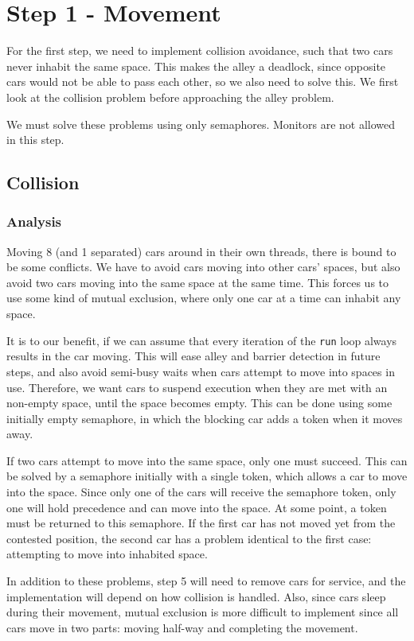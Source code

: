\section{Step 1 - Movement}
For the first step, we need to implement collision avoidance, such that two cars never inhabit the same space. This makes the alley a deadlock, since opposite cars would not be able to pass each other, so we also need to solve this. We first look at the collision problem before approaching the alley problem.

We must solve these problems using only semaphores. Monitors are not allowed in this step.

\subsection{Collision}
\subsubsection{Analysis}
Moving 8 (and 1 separated) cars around in their own threads, there is bound to be some conflicts. We have to avoid cars moving into other cars' spaces, but also avoid two cars moving into the same space at the same time. This forces us to use some kind of mutual exclusion, where only one car at a time can inhabit any space.

It is to our benefit, if we can assume that every iteration of the \texttt{run} loop always results in the car moving. This will ease alley and barrier detection in future steps, and also avoid semi-busy waits when cars attempt to move into spaces in use. Therefore, we want cars to suspend execution when they are met with an non-empty space, until the space becomes empty. This can be done using some initially empty semaphore, in which the blocking car adds a token when it moves away.

If two cars attempt to move into the same space, only one must succeed. This can be solved by a semaphore initially with a single token, which allows a car to move into the space. Since only one of the cars will receive the semaphore token, only one will hold precedence and can move into the space. At some point, a token must be returned to this semaphore. If the first car has not moved yet from the contested position, the second car has a problem identical to the first case: attempting to move into inhabited space.

In addition to these problems, step 5 will need to remove cars for service, and the implementation will depend on how collision is handled. Also, since cars sleep during their movement, mutual exclusion is more difficult to implement since all cars move in two parts: moving half-way and completing the movement.

